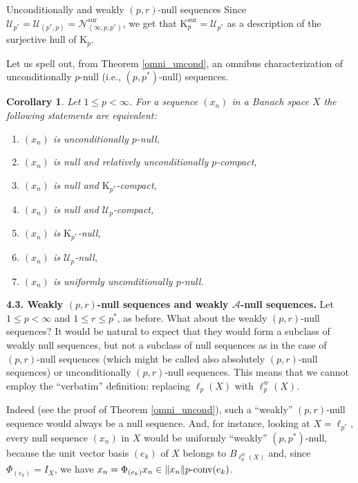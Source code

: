 \documentclass[a4paper,11pt]{amsart}
\newtheorem{cor}[prop]{Corollary}
\theoremstyle{definition}
\theoremstyle{definition}
\theoremstyle{definition}
\begin{document}
\begin{section}{Unconditionally and weakly ${{(p,r)}}$-null sequences}
Since ${{\mathcal U}}_{p^{\ast}}= {{\mathcal U}}_{({p^{\ast}}, p)}= {{\mathcal N}}_{(\infty, p, {p^{\ast}})}^{\mathrm{sur}}$, we get that $ \mathrm K_{p}^{\mathrm{sur}} = {{\mathcal U}}_{p^{\ast}}$ as a description of the surjective hull of $\mathrm K_p$.

Let us spell out, from Theorem \ref{omni_uncond}, an omnibus characterization of unconditionally $p$-null (i.e., $(p,{p^{\ast}})$-null) sequences.

\begin{cor}
Let $1 \leq p < \infty$. For a sequence $(x_n)$ in a Banach space $X$ the following statements are equivalent:
\begin{enumerate}
\item $(x_n)$ is unconditionally $p$-null,
\item $(x_n)$ is null and relatively unconditionally $p$-compact,
\item $(x_n)$ is null and $\mathrm K_{p^{\ast}}$-compact,
\item $(x_n)$ is null and ${{\mathcal U}}_p$-compact,
\item $(x_n)$ is $\mathrm K_{p^{\ast}}$-null,
\item $(x_n)$ is ${{\mathcal U}}_p$-null,
\item $(x_n)$ is uniformly unconditionally $p$-null.
\end{enumerate}
\end{cor}

\medskip
{\bf 4.3. Weakly ${{(p,r)}}$-null sequences and weakly ${{\mathcal A}}$-null sequences.} Let $1\leq p <\infty$ and $1\leq r \leq {p^{\ast}}$, as before. What about the weakly ${{(p,r)}}$-null sequences? It would be natural to expect that they would form a subclass of weakly null sequences, but not a subclass of null sequences as in the case of ${{(p,r)}}$-null sequences (which might be called also absolutely ${{(p,r)}}$-null sequences) or unconditionally ${{(p,r)}}$-null sequences. This means that we cannot employ the ``verbatim'' definition: replacing $\ell_p(X)$ with $\ell_p^w(X)$. 

Indeed (see the proof of Theorem \ref{omni_uncond}), such a ``weakly'' ${{(p,r)}}$-null sequence would always be a null sequence. And, for instance, looking at $X=\ell_{p^{\ast}}$, every null sequence $(x_n)$ in $X$ would be uniformly ``weakly'' $(p,{p^{\ast}})$-null, because the unit vector basis $(e_k)$ of $X$ belongs to $B_{\ell_p^w(X)}$ and, since $\Phi_{(e_k)}=I_X$, we have $x_n= \Phi_{(e_k)}x_n \in {\left\lVert {x_n} \right\rVert} p \textnormal{-conv}(e_k)$.


\end{section}
\end{document}
